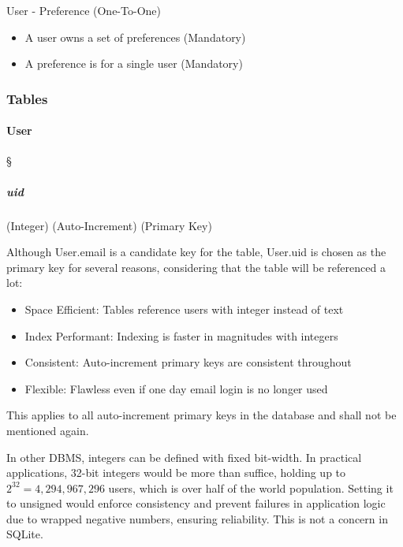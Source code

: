 User - Preference (One-To-One) \textdagger{}
\begin{itemize}
	\item A user owns a set of preferences (Mandatory)

	\item A preference is for a single user (Mandatory)
\end{itemize}

\subsubsection{Tables}
\label{data-layer.design.user.tables}

\paragraph{User}
\S{} \label{data-layer.design.user.tables.user}

\subparagraph{uid}
(Integer) (Auto-Increment) (Primary Key) \label{data-layer.design.user.tables.user.uid}

Although User.email is a candidate key for the table, User.uid is chosen as the primary
key for several reasons, considering that the table will be referenced a lot:

\begin{itemize}
	\item Space Efficient: Tables reference users with integer instead of text

	\item Index Performant: Indexing is faster in magnitudes with integers

	\item Consistent: Auto-increment primary keys are consistent throughout

	\item Flexible: Flawless even if one day email login is no longer used
\end{itemize}

This applies to all auto-increment primary keys in the database and shall not be
mentioned again.

\textdagger{} In other DBMS, integers can be defined with fixed bit-width. In
practical applications, 32-bit integers would be more than suffice, holding up
to $2^{32}=4 ,294,967,296$ users, which is over half of the world population.
Setting it to unsigned would enforce consistency and prevent failures in
application logic due to wrapped negative numbers, ensuring reliability. This is
not a concern in SQLite.

